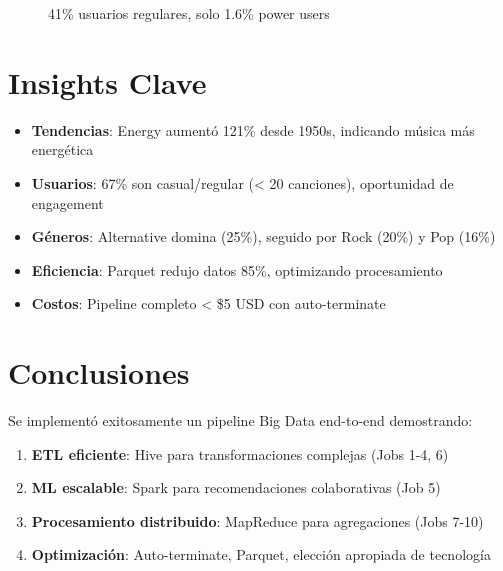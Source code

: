\documentclass[11pt,a4paper]{article}
\begin{document}
\begin{figure}[h]
\centering
{}
\caption{41\% usuarios regulares, solo 1.6\% power users}
\end{figure}

\section{Insights Clave}

\begin{itemize}
    \item \textbf{Tendencias}: Energy aumentó 121\% desde 1950s, indicando música más energética
    \item \textbf{Usuarios}: 67\% son casual/regular (< 20 canciones), oportunidad de engagement
    \item \textbf{Géneros}: Alternative domina (25\%), seguido por Rock (20\%) y Pop (16\%)
    \item \textbf{Eficiencia}: Parquet redujo datos 85\%, optimizando procesamiento
    \item \textbf{Costos}: Pipeline completo < \$5 USD con auto-terminate
\end{itemize}

\section{Conclusiones}

Se implementó exitosamente un pipeline Big Data end-to-end demostrando:

\begin{enumerate}
    \item \textbf{ETL eficiente}: Hive para transformaciones complejas (Jobs 1-4, 6)
    \item \textbf{ML escalable}: Spark para recomendaciones colaborativas (Job 5)
    \item \textbf{Procesamiento distribuido}: MapReduce para agregaciones (Jobs 7-10)
    \item \textbf{Optimización}: Auto-terminate, Parquet, elección apropiada de tecnología
\end{enumerate}
\end{document}
